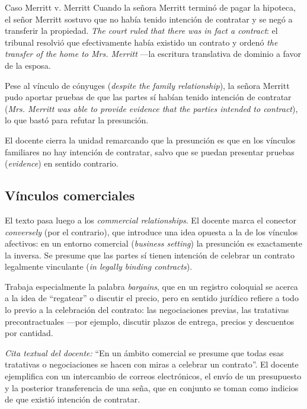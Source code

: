 \documentclass[12pt,oneside]{book}
\begin{document}
\begin{example}{Caso Merritt v. Merritt}
Cuando la señora Merritt terminó de pagar la hipoteca, el señor Merritt sostuvo que no había tenido intención de contratar y se negó a transferir la propiedad. \textit{The court ruled that there was in fact a contract}: el tribunal resolvió que efectivamente había existido un contrato y ordenó \textit{the transfer of the home to Mrs. Merritt} —la escritura translativa de dominio a favor de la esposa.

Pese al vínculo de cónyuges (\textit{despite the family relationship}), la señora Merritt pudo aportar pruebas de que las partes sí habían tenido intención de contratar (\textit{Mrs. Merritt was able to provide evidence that the parties intended to contract}), lo que bastó para refutar la presunción.
\end{example}

El docente cierra la unidad remarcando que la presunción es que en los vínculos familiares no hay intención de contratar, salvo que se puedan presentar pruebas (\textit{evidence}) en sentido contrario.

\subsection{Vínculos comerciales}

El texto pasa luego a los \textit{commercial relationships}. El docente marca el conector \textit{conversely} (por el contrario), que introduce una idea opuesta a la de los vínculos afectivos: en un entorno comercial (\textit{business setting}) la presunción es exactamente la inversa. Se presume que las partes sí tienen intención de celebrar un contrato legalmente vinculante (\textit{in legally binding contracts}).

Trabaja especialmente la palabra \textit{bargains}, que en un registro coloquial se acerca a la idea de ``regatear'' o discutir el precio, pero en sentido jurídico refiere a todo lo previo a la celebración del contrato: las negociaciones previas, las tratativas precontractuales —por ejemplo, discutir plazos de entrega, precios y descuentos por cantidad.

\begin{note}
\textit{Cita textual del docente:} ``En un ámbito comercial se presume que todas esas tratativas o negociaciones se hacen con miras a celebrar un contrato''. El docente ejemplifica con un intercambio de correos electrónicos, el envío de un presupuesto y la posterior transferencia de una seña, que en conjunto se toman como indicios de que existió intención de contratar.
\end{note}
\end{document}
